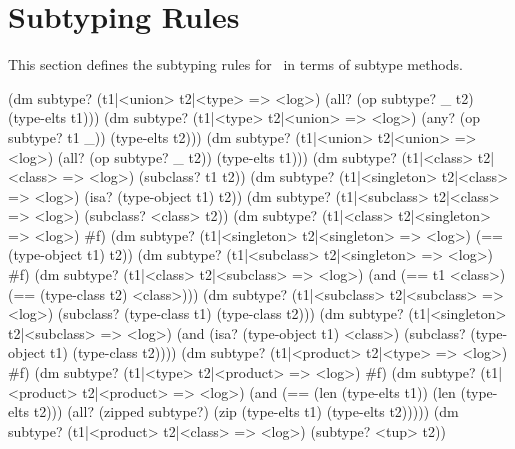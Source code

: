 \documentclass[twoside,twocolumn,9pt]{extarticle}
\begin{document}
\section{Subtyping Rules}
\label{subtyping}

This section defines the subtyping rules for \goo\ in terms of subtype
methods.  

\begin{exv}
(dm subtype? (t1|<union> t2|<type> => <log>)
  (all? (op subtype? _ t2) (type-elts t1)))
(dm subtype? (t1|<type> t2|<union> => <log>)
  (any? (op subtype? t1 _)) (type-elts t2)))
(dm subtype? (t1|<union> t2|<union> => <log>)
  (all? (op subtype? _ t2)) (type-elts t1)))
(dm subtype? (t1|<class> t2|<class> => <log>)
  (subclass? t1 t2))
(dm subtype? (t1|<singleton> t2|<class> => <log>)
  (isa? (type-object t1) t2))
(dm subtype? (t1|<subclass> t2|<class> => <log>)
  (subclass? <class> t2))
(dm subtype? (t1|<class> t2|<singleton> => <log>) #f)
(dm subtype? (t1|<singleton> t2|<singleton> => <log>)
  (== (type-object t1) t2))
(dm subtype? (t1|<subclass> t2|<singleton> => <log>) #f)
(dm subtype? (t1|<class> t2|<subclass> => <log>)
  (and (== t1 <class>) (== (type-class t2) <class>)))
(dm subtype? (t1|<subclass> t2|<subclass> => <log>)
  (subclass? (type-class t1) (type-class t2)))
(dm subtype? (t1|<singleton> t2|<subclass> => <log>)
  (and (isa? (type-object t1) <class>)
       (subclass? (type-object t1) (type-class t2))))
(dm subtype? (t1|<product> t2|<type> => <log>) #f)
(dm subtype? (t1|<type> t2|<product> => <log>) #f)
(dm subtype? (t1|<product> t2|<product> => <log>)
  (and (== (len (type-elts t1)) (len (type-elts t2)))
       (all? (zipped subtype?) (zip (type-elts t1) (type-elts t2)))))
(dm subtype? (t1|<product> t2|<class> => <log>)
  (subtype? <tup> t2))
\end{exv}
\end{document}

